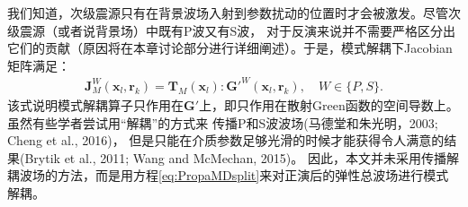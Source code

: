 我们知道，次级震源只有在背景波场入射到参数扰动的位置时才会被激发。尽管次级震源（或者说背景场）中既有P波又有S波，
对于反演来说并不需要严格区分出它们的贡献（原因将在本章讨论部分进行详细阐述）。于是，模式解耦下Jacobian
矩阵满足：
\begin{equation}
        \begin{split} 
        \mathbf{J}^W_M(\mathbf{x}_l,\mathbf{r}_k)=
        \mathbf{T}_M(\mathbf{x}_l):\mathbf{G}'^W(\mathbf{x}_l,\mathbf{r}_k),\quad
        W\in\{P, S\}.
        \end{split}
        \label{eq:EquivFre1}
\end{equation}
该式说明模式解耦算子只作用在$\mathbf{G}'$上，即只作用在散射Green函数的空间导数上。虽然有些学者尝试用“解耦”的方式来
传播P和S波波场(马德堂和朱光明，2003\cite{马德堂2003}; Cheng et al.,
2016\cite{cheng:2016})，
但是只能在介质参数足够光滑的时候才能获得令人满意的结果(Brytik et al., 2011\cite{brytik:2011};
Wang and McMechan, 2015\cite{wang.mcmechan:2015b})。
因此，本文并未采用传播解耦波场的方法，而是用方程\eqref{eq:PropaMDsplit}来对正演后的弹性总波场进行模式解耦。

